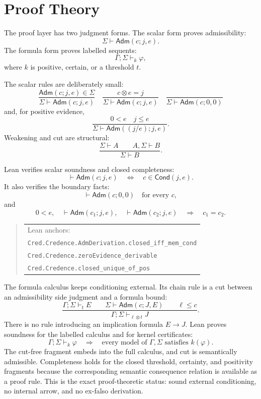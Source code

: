 \documentclass[11pt,a4paper]{article}
\newcommand{\Cond}{\mathsf{Cond}}
\newcommand{\Adm}{\mathsf{Adm}}
\newcommand{\conjc}{\otimes}
\newcommand{\Lean}[1]{\texttt{#1}}
\newcommand{\seq}{\vdash}
\begin{document}
\section{Proof Theory}

The proof layer has two judgment forms.  The scalar form proves
admissibility:
\[
  \Sigma\seq\Adm(c;j,e).
\]
The formula form proves labelled sequents:
\[
  \Gamma;\Sigma\seq_k\varphi,
\]
where $k$ is positive, certain, or a threshold $t$.

The scalar rules are deliberately small:
\[
\frac{\Adm(c;j,e)\in\Sigma}{\Sigma\seq\Adm(c;j,e)}
\quad
\frac{c\conjc e=j}{\Sigma\seq\Adm(c;j,e)}
\quad
\frac{}{\Sigma\seq\Adm(c;0,0)}
\]
and, for positive evidence,
\[
\frac{0<e\quad j\le e}{\Sigma\seq
  \Adm\!\left((j/e);j,e\right)}.
\]
Weakening and cut are structural:
\[
\frac{\Sigma\seq A\qquad A,\Sigma\seq B}{\Sigma\seq B}.
\]

Lean verifies scalar soundness and closed completeness:
\[
  \seq\Adm(c;j,e)
  \quad\Longleftrightarrow\quad
  c\in\Cond(j,e).
\]
It also verifies the boundary facts:
\[
  \seq\Adm(c;0,0)\quad\text{for every }c,
\]
and
\[
  0<e,\quad
  \seq\Adm(c_1;j,e),\quad
  \seq\Adm(c_2;j,e)
  \quad\Longrightarrow\quad
  c_1=c_2.
\]
\begin{quote}\scriptsize
\begin{tabular}{@{}l@{}}
Lean anchors: \\
\Lean{Cred.Credence.AdmDerivation.closed\_iff\_mem\_cond}\\
\Lean{Cred.Credence.zeroEvidence\_derivable}\\
\Lean{Cred.Credence.closed\_unique\_of\_pos}
\end{tabular}
\end{quote}

The formula calculus keeps conditioning external.  Its chain rule is a
cut between an admissibility side judgment and a formula bound:
\[
\frac{
  \Gamma;\Sigma\seq_t E
  \qquad
  \Sigma\seq\Adm(c;J,E)
  \qquad
  \ell\le c
}{
  \Gamma;\Sigma\seq_{\ell\conjc t} J
}.
\]
There is no rule introducing an implication formula $E\to J$.
Lean proves soundness for the labelled calculus and for kernel
certificates:
\[
  \Gamma;\Sigma\seq_k\varphi
  \quad\Longrightarrow\quad
  \text{every model of }\Gamma,\Sigma\text{ satisfies }k(\varphi).
\]
The cut-free fragment embeds into the full calculus, and cut is
semantically admissible.  Completeness holds for the closed threshold,
certainty, and positivity fragments because the corresponding semantic
consequence relation is available as a proof rule.  This is the exact
proof-theoretic status: sound external conditioning, no internal arrow,
and no ex-falso derivation.
\end{document}
